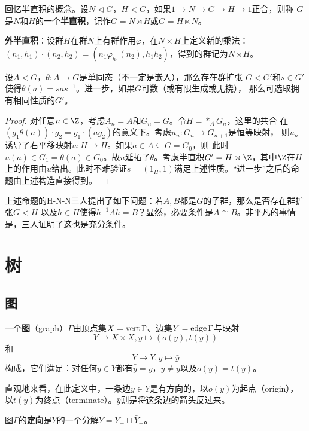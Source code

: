 \begin{definition}
    回忆半直积的概念。设$N \lhd G$，$H < G$，如果$1 \to N \to G \to H \to 1$正合，则称
    $G$是$N$和$H$的一个\textbf{半直积}，记作$G = N \rtimes H$或$G = H \ltimes N$。

    \textbf{外半直积}：设群$H$在群$N$上有群作用$\varphi$，在$N \times H$上定义新的乘法：
    $(n_1,h_1)\cdot(n_2,h_2) = (n_1\varphi_{h_1}(n_2),h_1h_2)$，得到的群记为$N \rtimes H$。
\end{definition}
\begin{proposition}
    设$A < G$，$\theta \colon A \to G$是单同态（不一定是嵌入），那么存在群扩张
    $G < G'$和$s \in G'$使得$\theta(a) = sas^{-1}$。进一步，如果$G$可数（或有限生成或无挠），
    那么可选取拥有相同性质的$G'$。
\end{proposition}
\begin{proof}
    对任意$n \in \Z$，考虑$A_n = A$和$G_n = G$。令$H = *_A G_n$，这里的共合
    在$(g_1\theta(a))\cdot g_2 = g_1 \cdot (ag_2)$的意义下。考虑$u_n \colon G_n \to G_{n+1}$是恒等映射，
    则$u_n$诱导了右平移映射$u \colon H \to H$。如果$a \in A \subseteq G = G_0$，则
    此时$u(a) \in G_1 = \theta(a) \in G_0$。故$u$延拓了$\theta$。考虑半直积$G' = H \rtimes \Z$，其中$\Z$在$H$
    上的作用由$u$给出。此时不难验证$s = (1_H,1)$满足上述性质。“进一步”之后的命题由上述构造直接得到。
\end{proof}
\begin{remark}
    上述命题的H-N-N三人提出了如下问题：若$A,B$都是$G$的子群，那么是否存在群扩张$G < H$
    以及$h \in H$使得$h^{-1}Ah = B$？显然，必要条件是$A \cong B$。非平凡的事情是，三人证明了这也是充分条件。
\end{remark}
\section{树}
\subsection{图}
\begin{definition}
    一个\textbf{图}（graph）$\Gamma$由顶点集$X = \operatorname{vert} \Gamma$、边集$Y = \operatorname{edge} \Gamma$与映射
    \[Y \to X \times X,y \mapsto (o(y),t(y))\]和\[Y \to Y,y \mapsto \bar{y}\]
    构成，它们满足：对任何$y \in Y$都有$\bar{\bar{y}} = y$，$\bar{y} \neq y$以及$o(y) = t(\bar{y})$。
\end{definition}
直观地来看，在此定义中，一条边$y \in Y$是有方向的，以$o(y)$为起点（origin），
以$t(y)$为终点（terminate）。$\bar{y}$则是将这条边的箭头反过来。
\begin{definition}
    图$\Gamma$的\textbf{定向}是$Y$的一个分解$Y = Y_{+} \sqcup \bar{Y}_+$。
\end{definition}

